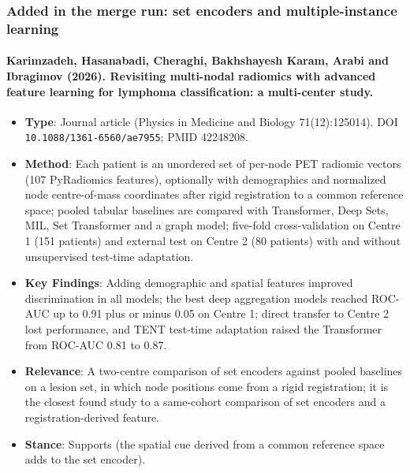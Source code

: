 \documentclass[journal,onecolumn]{IEEEtran}
\begin{document}
\subsubsection{Added in the merge run: set encoders and multiple-instance learning}

\paragraph{Karimzadeh, Hasanabadi, Cheraghi, Bakhshayesh Karam, Arabi and Ibragimov (2026). Revisiting multi-nodal radiomics with advanced feature learning for lymphoma classification: a multi-center study.~\cite{Karimzadeh2026Revisiting}}\mbox{}

\begin{itemize}

\item{} \textbf{Type}: Journal article (Physics in Medicine and Biology 71(12):125014). DOI \nolinkurl{10.1088/1361-6560/ae7955}; PMID 42248208.

\item{} \textbf{Method}: Each patient is an unordered set of per-node PET radiomic vectors (107 PyRadiomics features), optionally with demographics and normalized node centre-of-mass coordinates after rigid registration to a common reference space; pooled tabular baselines are compared with Transformer, Deep Sets, MIL, Set Transformer and a graph model; five-fold cross-validation on Centre 1 (151 patients) and external test on Centre 2 (80 patients) with and without unsupervised test-time adaptation.

\item{} \textbf{Key Findings}: Adding demographic and spatial features improved discrimination in all models; the best deep aggregation models reached ROC-AUC up to 0.91 plus or minus 0.05 on Centre 1; direct transfer to Centre 2 lost performance, and TENT test-time adaptation raised the Transformer from ROC-AUC 0.81 to 0.87.

\item{} \textbf{Relevance}: A two-centre comparison of set encoders against pooled baselines on a lesion set, in which node positions come from a rigid registration; it is the closest found study to a same-cohort comparison of set encoders and a registration-derived feature.

\item{} \textbf{Stance}: Supports (the spatial cue derived from a common reference space adds to the set encoder).


\end{itemize}
\end{document}
